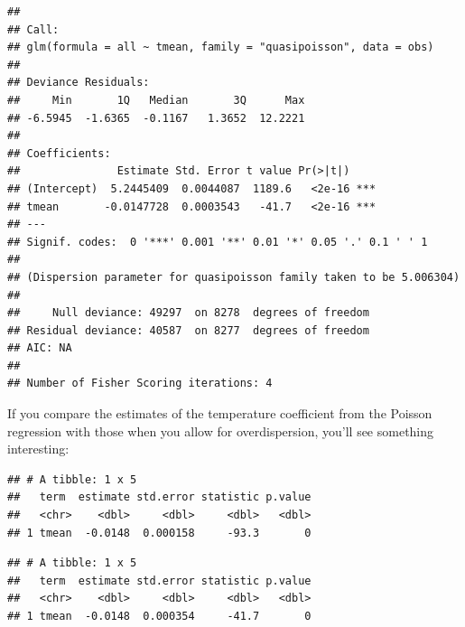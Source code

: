 \documentclass[
]{book}
\newenvironment{Shaded}{\begin{snugshade}}{\end{snugshade}}
\newcommand{\KeywordTok}[1]{\textcolor[rgb]{0.13,0.29,0.53}{\textbf{#1}}}
\newcommand{\NormalTok}[1]{#1}
\newcommand{\OperatorTok}[1]{\textcolor[rgb]{0.81,0.36,0.00}{\textbf{#1}}}
\newcommand{\StringTok}[1]{\textcolor[rgb]{0.31,0.60,0.02}{#1}}
\begin{document}
\begin{verbatim}
## 
## Call:
## glm(formula = all ~ tmean, family = "quasipoisson", data = obs)
## 
## Deviance Residuals: 
##     Min       1Q   Median       3Q      Max  
## -6.5945  -1.6365  -0.1167   1.3652  12.2221  
## 
## Coefficients:
##               Estimate Std. Error t value Pr(>|t|)    
## (Intercept)  5.2445409  0.0044087  1189.6   <2e-16 ***
## tmean       -0.0147728  0.0003543   -41.7   <2e-16 ***
## ---
## Signif. codes:  0 '***' 0.001 '**' 0.01 '*' 0.05 '.' 0.1 ' ' 1
## 
## (Dispersion parameter for quasipoisson family taken to be 5.006304)
## 
##     Null deviance: 49297  on 8278  degrees of freedom
## Residual deviance: 40587  on 8277  degrees of freedom
## AIC: NA
## 
## Number of Fisher Scoring iterations: 4
\end{verbatim}

If you compare the estimates of the temperature coefficient from the Poisson
regression with those when you allow for overdispersion, you'll see something
interesting:

\begin{Shaded}
\end{Shaded}

\begin{verbatim}
## # A tibble: 1 x 5
##   term  estimate std.error statistic p.value
##   <chr>    <dbl>     <dbl>     <dbl>   <dbl>
## 1 tmean  -0.0148  0.000158     -93.3       0
\end{verbatim}

\begin{Shaded}
\end{Shaded}

\begin{verbatim}
## # A tibble: 1 x 5
##   term  estimate std.error statistic p.value
##   <chr>    <dbl>     <dbl>     <dbl>   <dbl>
## 1 tmean  -0.0148  0.000354     -41.7       0
\end{verbatim}
\end{document}

